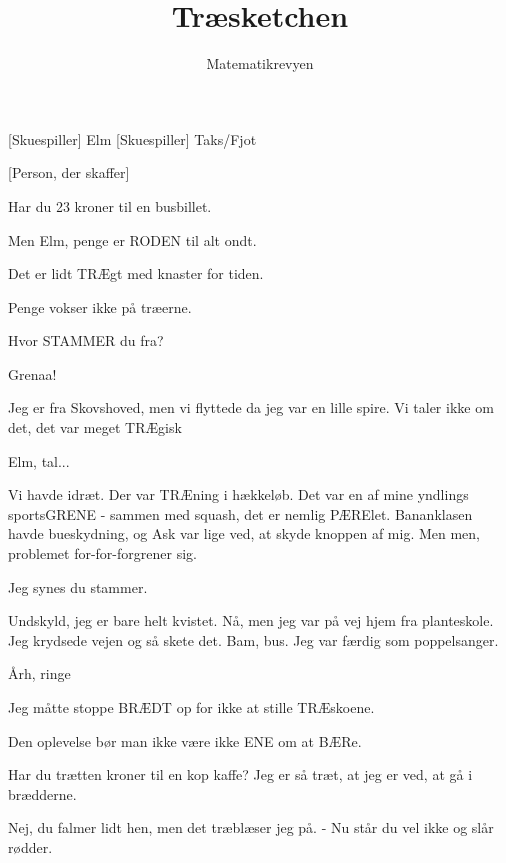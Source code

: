 \documentclass[a4paper,11pt]{article}
\title{Træsketchen}
\author{Matematikrevyen}
\begin{document}
\maketitle

\begin{roles}
[Skuespiller] Elm
[Skuespiller] Taks/Fjot
\end{roles}

\begin{props}
[Person, der skaffer]
\end{props}

\begin{sketch}

 Har du 23 kroner til en busbillet.

 Men Elm, penge er RODEN til alt ondt.

 Det er lidt TRÆgt med knaster for tiden.

 Penge vokser ikke på træerne.


 Hvor STAMMER du fra?

 Grenaa!

 Jeg er fra Skovshoved, men vi flyttede da jeg var en lille spire. Vi taler ikke om det, det var meget TRÆgisk

 Elm, tal...

 Vi havde idræt. Der var TRÆning i hækkeløb. Det var en af mine yndlings sportsGRENE - sammen med squash, det er nemlig PÆRElet. Bananklasen havde bueskydning, og Ask var lige ved, at skyde knoppen af mig. Men men, problemet for-for-forgrener sig.

 Jeg synes du stammer.

 Undskyld, jeg er bare helt kvistet. Nå, men jeg var på vej hjem fra planteskole. Jeg krydsede vejen og så skete det. Bam, bus. Jeg var færdig som poppelsanger.

 Årh, ringe

 Jeg måtte stoppe BRÆDT op for ikke at stille TRÆskoene.

 Den oplevelse bør man ikke være ikke ENE om at BÆRe.

 Har du trætten kroner til en kop kaffe? Jeg er så træt, at jeg er ved, at gå i brædderne.

 Nej, du falmer lidt hen, men det træblæser jeg på. - Nu står du vel ikke og slår rødder.


\end{sketch}
\end{document}
